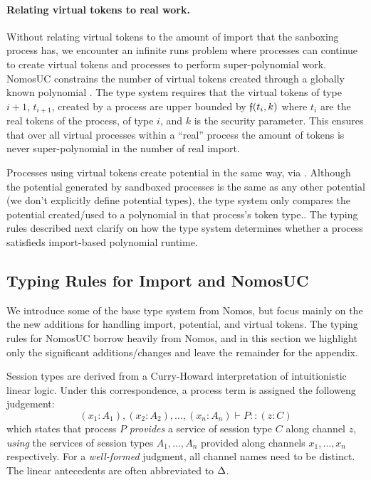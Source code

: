 \paragraph{Relating virtual tokens to real work.}
Without relating virtual tokens to the amount of import that the sanboxing process has, we encounter an infinite runs problem where processes can continue to create virtual tokens and processes to perform super-polynomial work.
NomosUC constrains the number of virtual tokens created through a globally known polynomial \GlobalF.
The type system requires that the virtual tokens of type $i+1$, $t_{i+1}$, created by a process are upper bounded by $\mathfrak{f}(t_i, k)$ where $t_i$ are the real tokens of the process, of type $i$, and $k$ is the security parameter. 
This ensures that over all virtual processes within a ``real'' process the amount of tokens is never super-polynomial in the number of real import.

Processes using virtual tokens create potential in the same way, via \inline{$\ngenpot$}. 
Although the potential generated by sandboxed processes is the same as any other potential (we don't explicitly define potential types), the type system only compares the potential created/used to a polynomial in that process's token type.. 
The typing rules described next clarify on how the type system determines whether a process satisfieds import-based polynomial runtime.




\subsection{Typing Rules for Import and NomosUC}
We introduce some of the base type system from Nomos, but focus mainly on the the new additions for handling import, potential, and virtual tokens. 
The typing rules for NomosUC borrow heavily from Nomos, and in this section we highlight only the significant additions/changes and leave the remainder for the appendix.

Session types are derived from a Curry-Howard interpretation of intuitionistic linear logic. 
Under this correspondence, a process term is assigned the followeng judgement: 
\[
(x_1 : A_1), (x_2 : A_2), \ldots, (x_n : A_n) \vdash P :: (z : C)
\]
which states that process $P$ \emph{provides} a service
of session type $C$ along channel $z$, \emph{using} the services of session
types $A_1, \ldots, A_n$ provided along channels $x_1, \ldots, x_n$ respectively.
For a \emph{well-formed} judgment, all channel names need to be distinct.
The linear antecedents are often abbreviated to $\Delta$.

